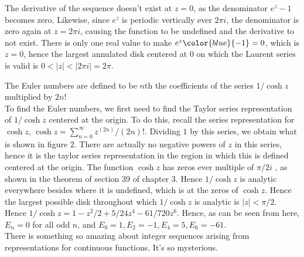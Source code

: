 \documentclass{article}
\theoremstyle{definition}
\newcommand{\infsum}{\sum_{n = 0}^{\infty}}
\newcommand{\cs}[1]{\color{blue}{#1}\normalcolor}
\begin{document}
The derivative of the sequence doesn't exist at $z = 0$, as the denominator $e^z -1$ becomes zero. Likewise, since $e^z$ is periodic vertically ever $2\pi i$, the denominator is zero again at $z = 2\pi i$, causing the function to be undefined and the derivative to not exist. There is only one real value to make $e^z \cs{-1} = 0$, \cs{($e^z$ is never 0)} which is $z = 0$, hence the largest annulated disk centered at $0$ on which the Laurent series is valid is $0 < |z| < |2\pi i| = 2\pi$.

\cs{5/5}

 The Euler numbers are defined to be $n$th the coefficients of the series $1/\cosh z$ multiplied by $2n!$\\
 To find the Euler numbers, we first need to find the Taylor series representation of $1/\cosh z$ centered at the origin. To do this, recall the series representation for $\cosh z$, $\cosh z = \infsum z^(2n)/(2n)!$. Dividing $1$ by this series, we obtain what is shown in figure 2. There are actually no negative powers of $z$ in this series, hence it is the taylor series representation in the region in which this is defined centered at the origin. The function $\cosh{z}$ has zeros ever multiple of $\pi/2 i$ \cs{That isn't quite right -- it's at differences from $i\pi/2$ of multiples of $2\pi i$.} , as shown in the theorem of section 39 of chapter 3. Hence $1/\cosh z$ is analytic everywhere besides where it is undefined, which is at the zeros of $\cosh z$. Hence the largest possible disk throughout which $1/\cosh z$ is analytic is $|z| < \pi/2$. Hence $1/\cosh z = 1 - z^2/2 + 5/24 z^4 - 61/720z^6$. Hence, as can be seen from here, $E_n = 0$ for all odd $n$, and $E_0 = 1, E_2  = -1, E_4 = 5, E_6 = -61$.\\

 There is something so amazing about integer sequences arising from representations for continuous functions. It's so mysterious.\\

\cs{5/5}

\cs{Sec 73: 10/10} 
\end{document}
